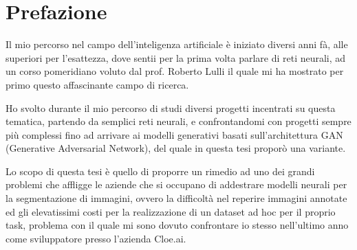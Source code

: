 \clearpage
\phantom{a}
\vfill


\chapter{Prefazione \ok \ok \ok}


\begin{flushleft}


\begin{comment}



\end{comment}


Il mio percorso nel campo dell'inteligenza artificiale è iniziato diversi anni fà, alle superiori per l'esattezza,
dove sentii per la prima volta parlare di reti neurali, ad un corso pomeridiano voluto dal prof. Roberto Lulli il quale mi ha mostrato per primo questo affascinante campo di ricerca.

Ho svolto durante il mio percorso di studi diversi progetti incentrati su questa tematica, partendo da semplici reti neurali,
e confrontandomi con progetti sempre più complessi fino ad arrivare ai modelli generativi basati sull'architettura GAN (Generative Adversarial Network),
del quale in questa tesi proporò una variante.

Lo scopo di questa tesi è quello di proporre un rimedio ad uno dei grandi problemi che affligge le aziende che si occupano di addestrare modelli neurali per la segmentazione di immagini,
ovvero la difficoltà nel reperire immagini annotate ed gli elevatissimi costi per la realizzazione di un dataset ad hoc per il proprio task, problema con il quale mi sono dovuto confrontare io stesso nell'ultimo
anno come sviluppatore presso l'azienda Cloe.ai.


\end{flushleft}



\vfill
\newpage